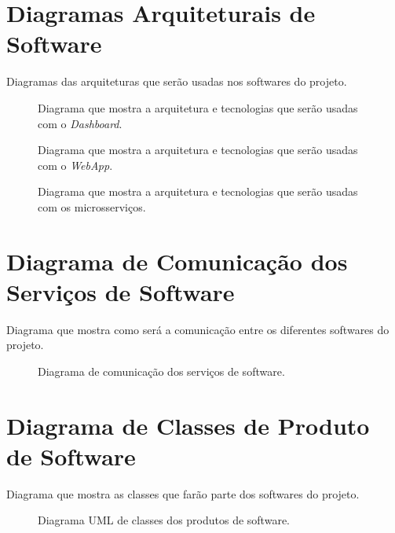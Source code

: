 \begin{apendicesenv}

\partapendices

\chapter{Diagramas Arquiteturais de Software}

Diagramas das arquiteturas que serão usadas nos softwares do projeto.

\begin{figure}[h]
	\caption{\label{fig:diagrama-arq-dashboard} Diagrama que mostra a arquitetura e tecnologias que serão usadas com o \textit{Dashboard}.}
\end{figure}\newpage

\begin{figure}[h]
	\caption{\label{fig:diagrama-arq-webApp} Diagrama que mostra a arquitetura e tecnologias que serão usadas com o \textit{WebApp}.}
\end{figure}\newpage

\begin{figure}[h]
	\caption{\label{fig:diagrama-arq-microsservicos} Diagrama que mostra a arquitetura e tecnologias que serão usadas com os microsserviços.}
\end{figure}\newpage

\chapter{Diagrama de Comunicação dos Serviços de Software}

Diagrama que mostra como será a comunicação entre os diferentes softwares do projeto.

\begin{figure}[h]
	\caption{\label{fig:diagrama-comm-soft} Diagrama de comunicação dos serviços de software.}
\end{figure}

\chapter{Diagrama de Classes de Produto de Software}

Diagrama que mostra as classes que farão parte dos softwares do projeto.

\begin{figure}[h]
	\caption{\label{fig:diagrama-classe-soft} Diagrama UML de classes dos produtos de software.}
\end{figure}

\end{apendicesenv}
